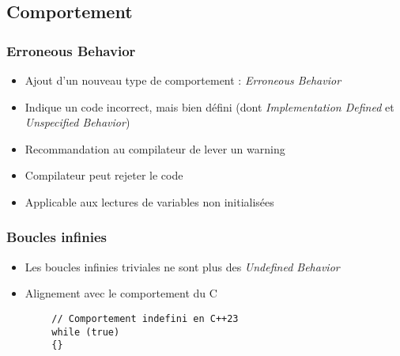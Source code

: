 \documentclass[C++.tex]{subfiles}
\begin{document}
\subsection*{Comportement}
\begin{frame}[fragile]
	\frametitle{Erroneous Behavior}
	\begin{itemize}
		\item Ajout d'un nouveau type de comportement : \textit{Erroneous Behavior}
		\item Indique un code incorrect, mais bien défini (dont \textit{Implementation Defined} et \textit{Unspecified Behavior})
		\item Recommandation au compilateur de lever un warning
		\item Compilateur peut rejeter le code
		\item Applicable aux lectures de variables non initialisées
	\end{itemize}

\end{frame}

\begin{frame}[fragile]
	\frametitle{Boucles infinies}
	\begin{itemize}
		\item Les boucles infinies triviales ne sont plus des \textit{Undefined Behavior}
		\item Alignement avec le comportement du C
	\end{itemize}

	\begin{verbatim}
		// Comportement indefini en C++23
		while (true)
		{}
	\end{verbatim}

\end{frame}
\end{document}
